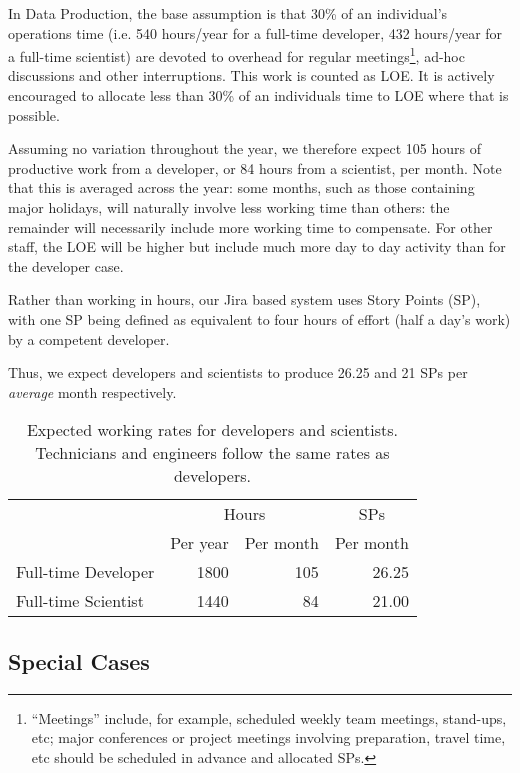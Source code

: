 In Data Production, the base assumption is that 30\% of an individual's \RO operations time (i.e. 540 hours/year for a full-time developer, 432 hours/year for a full-time scientist) are devoted to
overhead for regular meetings\footnote{``Meetings'' include, for example, scheduled weekly team meetings, stand-ups, etc;
major conferences or project meetings involving preparation, travel time, etc should be scheduled in advance and allocated \glspl{SP}.},
ad-hoc discussions and other interruptions.
This work is counted as \gls{LOE}.
It is actively encouraged to allocate less than 30\% of an individuals time to \gls{LOE} where that is possible.

Assuming no variation throughout the year, we therefore expect 105 hours of productive work from a developer, or 84 hours from a scientist, per month.
Note that this is averaged across the year: some months, such as those containing major holidays, will naturally involve less working time than others: the remainder will necessarily include more working time to compensate. For other staff, the \gls{LOE} will be higher but include much more day to day activity than for the developer case.

Rather than working in hours, our Jira based system uses Story Points (\gls{SP}), with one \gls{SP} being defined as equivalent to four hours of effort (half a day's work) by a competent developer.

Thus, we expect developers and scientists to produce 26.25 and 21 \glspl{SP} per \emph{average} month respectively.

\begin{table}
\begin{longtable}[]{@{}lrrr@{}}
\hline
          & \multicolumn{2}{c}{Hours} & \multicolumn{1}{c}{\glspl{SP}} \\
          & Per year & Per month      & Per month \\
\hline
Full-time Developer & 1800     & 105            & 26.25 \\
Full-time Scientist & 1440     &  84            & 21.00 \\
\hline
\end{longtable}
\caption{Expected working rates for developers and scientists. Technicians and engineers follow the same rates as developers.}
\label{tab:working-rate}
\end{table}

\subsection{Special Cases}

